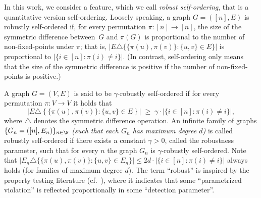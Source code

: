 In this work, we consider a feature,
which we call {\em robust self-ordering},
that is a quantitative version self-ordering.
%
Loosely speaking, a graph $G=([n],E)$ is robustly self-ordered if,
%
%
for every permutation $\pi:[n]\to[n]$,
the size of the symmetric difference between~$G$ and $\pi(G)$
is proportional to the number of non-fixed-points under $\pi$;
that is, $|E\triangle\{\{\pi(u),\pi(v)\}\!:\!\{u,v\}\!\in\!E\}|$
is proportional to $|\{i\!\in\![n]\!:\!\pi(i)\!\neq\!i\}|$.
(In contrast, self-ordering only means that
the size of the symmetric difference is positive
if the number of non-fixed-points is positive.)

%
\label{robust-asymmetric:def}
A graph $G=(V,E)$ is said to be {\sf $\gamma$-robustly self-ordered}
if for every permutation $\pi:V\to{V}$
it holds that
\begin{equation}\label{robust-asymmetric:eqdef}
\big|E\triangle\left\{\{\pi(u),\pi(v)\}\!:\!\{u,v\}\!\in\!E\right\}\big|
  \;\geq\; \gamma\cdot|\{i\in[n]\!:\!\pi(i)\neq i\}|,
\end{equation}
where $\triangle$ denotes the symmetric difference operation.
An infinite family of graphs $\{G_n=([n],E_n)\}_{n\in\N}$
{\em(such that each $G_n$ has maximum degree $d$)}
is called {\sf robustly self-ordered}
if there exists a constant $\gamma>0$, called the {\sf robustness parameter},
such that for every $n$ the graph $G_n$ is $\gamma$-robustly self-ordered.
\ED
Note that
$|E_n\triangle\{\{\pi(u),\pi(v)\}\!:\!\{u,v\}\!\in\!E_n\}|
 \leq 2d\cdot|\{i\in[n]\!:\!\pi(i)\neq i\}|$
always holds (for families of maximum degree $d$).
%
%
%
%
%
The term ``robust'' is inspired by
the property testing literature (cf.~\cite{RS}),
where it indicates that some ``parametrized violation''
is reflected proportionally in some ``detection parameter''.

